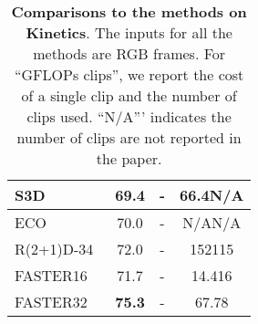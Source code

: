 \documentclass[10pt,twocolumn,letterpaper]{article}
\begin{document}
{{\begin{table}[t]
\begin{center}
{\begin{tabular}{l|c|c|c}
\hline
    S3D~\cite{Xie_2018_ECCV}                &  69.4        &   -  &   66.4N/A \\
\hline
    ECO~\cite{zolfaghari2018eco}            & 70.0          & - & N/AN/A \\
\hline
    R(2+1)D-34~\cite{tran2018closer}                    &  72.0        &  -   &   152115      \\
\hline\hline
    FASTER16                & 71.7   &    -      &  14.416   \\
\hline
    FASTER32               & {\bf 75.3}   &    -      & 67.78     \\
\hline

    \end{tabular}}
\end{center}
    \caption{{\bf Comparisons to the \sota methods on Kinetics}.
   The inputs for all the methods are RGB frames. For ``GFLOPs  clips'', we report the cost of a single clip and the number of clips used. ``N/A''' indicates the number of clips are not reported in the paper.
    }
\label{expr:final_results_K}
\end{table}
\begin{table}[t]
\begin{center}
\end{center}
\end{table}}}
\end{document}
